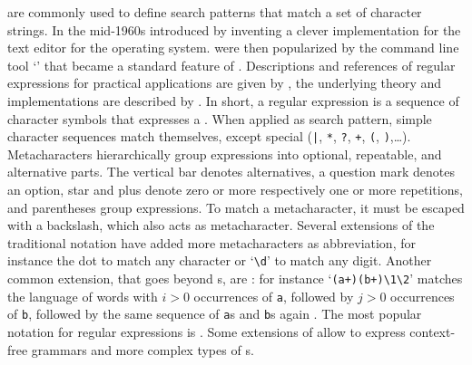  are commonly used to define search patterns that
match a set of character strings. In the mid-1960s 
introduced  by inventing a clever implementation for the text editor
 for the  operating system.  were then
popularized by the command line tool `' that became a standard
feature of . Descriptions and references of regular expressions for
practical applications are given by \textcite{Friedl2006}, the underlying
theory and implementations are described by \textcite{Cox2007}.  In short, a
regular expression is a sequence of character symbols that expresses a
. When applied as
search pattern, simple character sequences match themselves, except special
 (\texttt{|}, \texttt{*}, \texttt{?}, \texttt{+},
\texttt{(}, \texttt{)},\ldots). Metacharacters hierarchically group expressions
into optional, repeatable, and alternative parts.  The vertical bar denotes
alternatives, a question mark denotes an option, star and plus denote zero or
more respectively one or more repetitions, and parentheses group expressions.
To match a metacharacter, it must be escaped with a  backslash, which also acts
as metacharacter. Several extensions of the traditional  notation have
added more metacharacters as abbreviation, for instance the dot to match any
character or `\verb|\d|' to match any digit.  Another common extension, that
goes beyond s, are : for instance
`\verb|(a+)(b+)\1\2|' matches the language of words with $i>0$ occurrences of
\verb|a|, followed by $j>0$ occurrences of \verb|b|, followed by the same
sequence of \verb|a|s and \verb|b|s again \cite{Carle2009}. The most popular
notation for regular expressions is . Some extensions of  allow to express
context-free grammars and more complex types of s.

